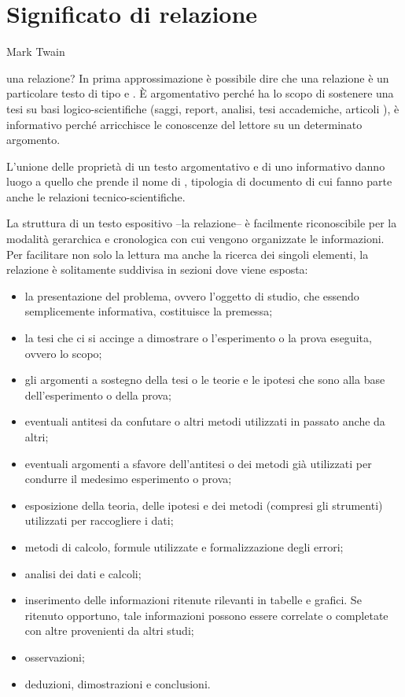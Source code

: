 			\section{Significato di relazione}

																					{Mark Twain}



 una relazione? In prima approssimazione è possibile dire che una relazione è un particolare testo di tipo  e . È argomentativo perché ha lo scopo di sostenere una tesi su basi logico-scientifiche (saggi, report, analisi, tesi accademiche, articoli \ecc), è informativo perché arricchisce le conoscenze del lettore su un determinato argomento.

L'unione delle proprietà di un testo argomentativo e di uno informativo danno luogo a quello che prende il nome di , tipologia di documento di cui fanno parte anche le relazioni tecnico-scientifiche.

La struttura di un testo espositivo --la relazione-- è facilmente riconoscibile per la modalità gerarchica e cronologica con cui vengono organizzate le informazioni. Per facilitare non solo la lettura ma anche la ricerca dei singoli elementi, la relazione è solitamente suddivisa in sezioni dove viene esposta:
\begin{itemize}
 \item la presentazione del problema, ovvero l'oggetto di studio, che essendo semplicemente informativa, costituisce la premessa;
 \item la tesi che ci si accinge a dimostrare o l'esperimento o la prova eseguita, ovvero lo scopo;
 \item gli argomenti a sostegno della tesi o le teorie e le ipotesi che sono alla base dell'esperimento o della prova;
 \item eventuali antitesi da confutare o altri metodi utilizzati in passato anche da altri;
 \item eventuali argomenti a sfavore dell'antitesi o dei metodi già utilizzati per condurre il medesimo esperimento o prova; 
 \item esposizione della teoria, delle ipotesi e dei metodi (compresi gli strumenti) utilizzati per raccogliere i dati;
 \item metodi di calcolo, formule utilizzate e formalizzazione degli errori;
 \item analisi dei dati e calcoli;
 \item inserimento delle informazioni ritenute rilevanti in tabelle e grafici. Se ritenuto opportuno, tale informazioni possono essere correlate o completate con altre provenienti da altri studi;
 \item osservazioni;
 \item deduzioni, dimostrazioni e conclusioni.
\end{itemize}


